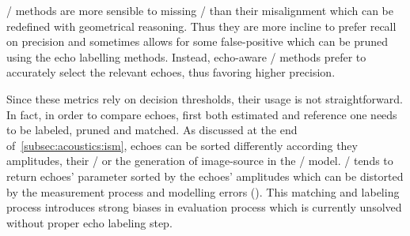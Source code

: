 \begin{itemize}
    \RooGE/ methods are more sensible to missing \TOAs/ than their misalignment which can be redefined with geometrical reasoning.
    Thus they are more incline to prefer recall on precision and sometimes allows for some false-positive which can be pruned using the echo labelling methods.
    Instead, echo-aware \SE/ methods prefer to accurately select the relevant echoes, thus favoring higher precision.
\end{itemize}

\mynewline
Since these metrics rely on decision thresholds, their usage is not straightforward.
In fact, in order to compare echoes, first both estimated and reference one needs to be labeled, pruned and matched.
As discussed at the end of~\cref{subsec:acoustics:ism}, echoes can be sorted differently according they amplitudes, their \TOAs/ or the generation of image-source in the \ISM/ model.
\AER/ tends to return echoes' parameter sorted by the echoes' amplitudes which can be distorted by the measurement process and modelling errors ().
This matching and labeling process introduces strong biases in evaluation process which is currently unsolved without proper echo labeling step.